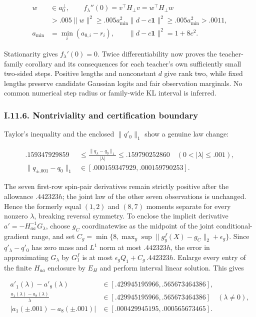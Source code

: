 \documentclass{article}
\begin{document}
\[
\begin{aligned}
w&\in a_0^\perp,\qquad
f_\lambda''(0)=v^\top H_\perp v=w^\top H_\perp w\\
&>.005\|w\|^2\ge .005a_{\min}^2\|d-c\mathbf1\|^2
\ge .005a_{\min}^2>.0011,\\
a_{\min}&=\min_i(a_{0,i}-r_i),\qquad
\|d-c\mathbf1\|^2=1+8c^2.
\end{aligned}
\tag{I.68}
\]

Stationarity gives \(f_\lambda'(0)=0\). Twice differentiability now
proves the teacher-family corollary and its consequences for each
teacher's own sufficiently small two-sided steps. Positive lengths and
nonconstant \(d\) give rank two, while fixed lengths preserve candidate
Gaussian logits and fair observation marginals. No common numerical step
radius or family-wide KL interval is inferred.

\subsubsection*{I.11.6. Nontriviality and certification
boundary}\label{i.11.6.-nontriviality-and-certification-boundary}

Taylor's inequality and the enclosed \(\|q'_0\|_1\) show a genuine law
change:

\[
\begin{aligned}
.159347929859&\le\frac{\|q_\lambda-q_0\|_1}{|\lambda|}
\le .159790252860\quad(0<|\lambda|\le .001),\\
\|q_{\pm.001}-q_0\|_1&\in[.000159347929,.000159790253].
\end{aligned}
\tag{I.69}
\]

The seven first-row spin-pair derivatives remain strictly positive after
the allowance \(.442323h\); the joint law of the other seven
observations is unchanged. Hence the formerly equal \((1,2)\) and
\((8,7)\) moments separate for every nonzero \(\lambda\), breaking
reversal symmetry. To enclose the implicit derivative
\(a'=-H_{aa}^{-1}G_\lambda\), choose \(g_C\) coordinatewise as the
midpoint of the joint conditional-gradient range, and set
\(C_g=\min\{8,\max_y\sup\|g_y^f(X)-g_C\|_2+\epsilon_g\}\). Since
\(q'_\lambda-q'_0\) has zero mass and \(L^1\) norm at most \(.442323h\),
the error in approximating \(G_\lambda\) by \(G_1^f\) is at most
\(\epsilon_gQ_1+C_g\,.442323h\). Enlarge every entry of the finite
\(H_{aa}\) enclosure by \(E_H\) and perform interval linear solution.
This gives

\[
\begin{aligned}
a'_1(\lambda)-a'_8(\lambda)&\in[.429945195966,.565673464386],\\
\frac{a_1(\lambda)-a_8(\lambda)}{\lambda}
&\in[.429945195966,.565673464386]\quad(\lambda\ne0),\\
|a_1(\pm.001)-a_8(\pm.001)|&\in[.000429945195,.000565673465].
\end{aligned}
\tag{I.70}
\]
\end{document}
